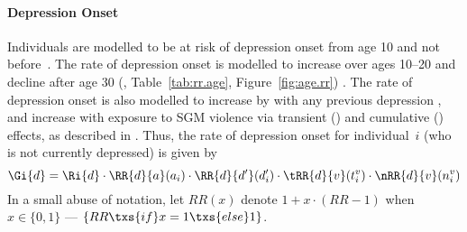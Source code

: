 \paragraph{Depression Onset}
Individuals are modelled to be at risk of depression onset
from age 10 and not before~\cite{Solmi2022}.
The rate of depression onset is modelled to
increase over ages 10--20 and decline after age 30
(, Table~\ref{tab:rr.age}, Figure~\ref{fig:age.rr})
\cite{Patten2010,Hankin2015,Solmi2022}.
The rate of depression onset is also modelled to increase
by  with any previous depression
\cite{Kendler2010},
and increase with exposure to SGM violence
via transient () and cumulative () effects,
as described in .
Thus, the rate of depression onset for individual~$i$
(who is not currently depressed) is given by
\begin{equation}
  \Gi{d} = \Ri{d}
     \cdot \RR{d}{a}(a_i)
     \cdot \RR{d}{d'}(d'_i)
     \cdot \tRR{d}{v}(t^v_i)
     \cdot \nRR{d}{v}(n^v_i)
\end{equation}
In a small abuse of notation, let $RR(x)$ denote $1+x{\cdot}(RR-1)$
when $x \in \{0,1\}$
--- \ie $\{RR\txs{if}x=1\txs{else}1\}$.
